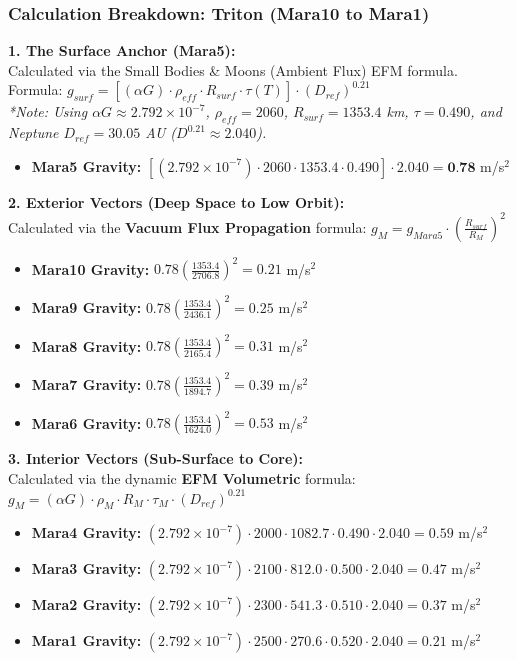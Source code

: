 \documentclass[11pt, a4paper]{article}
\begin{document}
\clearpage
\subsubsection{Calculation Breakdown: Triton (Mara10 to Mara1)}

\noindent \textbf{1. The Surface Anchor (Mara5):} \\
Calculated via the Small Bodies \& Moons (Ambient Flux) EFM formula. \\
Formula: $g_{surf} = \left[ (\alpha G) \cdot \rho_{eff} \cdot R_{surf} \cdot \tau(T) \right] \cdot (D_{ref})^{0.21}$ \\
\textit{*Note: Using $\alpha G \approx 2.792 \times 10^{-7}$, $\rho_{eff} = 2060$, $R_{surf} = 1353.4$ km, $\tau = 0.490$, and Neptune $D_{ref} = 30.05$ AU ($D^{0.21} \approx 2.040$).}
\begin{itemize}
  \item \textbf{Mara5 Gravity:} $\left[ (2.792 \times 10^{-7}) \cdot 2060 \cdot 1353.4 \cdot 0.490 \right] \cdot 2.040 = \textbf{0.78}$ m/s$^2$
\end{itemize}

\vspace{0.5em}
\noindent \textbf{2. Exterior Vectors (Deep Space to Low Orbit):} \\
Calculated via the \textbf{Vacuum Flux Propagation} formula: $g_M = g_{Mara5} \cdot \left( \frac{R_{surf}}{R_M} \right)^2$
\begin{itemize}
  \item \textbf{Mara10 Gravity:} $0.78 \left( \frac{1353.4}{2706.8} \right)^2 = 0.21$ m/s$^2$
  \item \textbf{Mara9 Gravity:} $0.78 \left( \frac{1353.4}{2436.1} \right)^2 = 0.25$ m/s$^2$
  \item \textbf{Mara8 Gravity:} $0.78 \left( \frac{1353.4}{2165.4} \right)^2 = 0.31$ m/s$^2$
  \item \textbf{Mara7 Gravity:} $0.78 \left( \frac{1353.4}{1894.7} \right)^2 = 0.39$ m/s$^2$
  \item \textbf{Mara6 Gravity:} $0.78 \left( \frac{1353.4}{1624.0} \right)^2 = 0.53$ m/s$^2$
\end{itemize}

\vspace{0.5em}
\noindent \textbf{3. Interior Vectors (Sub-Surface to Core):} \\
Calculated via the dynamic \textbf{EFM Volumetric} formula: $g_M = (\alpha G) \cdot \rho_{M} \cdot R_M \cdot \tau_M \cdot (D_{ref})^{0.21}$
\begin{itemize}
  \item \textbf{Mara4 Gravity:} $(2.792 \times 10^{-7}) \cdot 2000 \cdot 1082.7 \cdot 0.490 \cdot 2.040 = 0.59$ m/s$^2$
  \item \textbf{Mara3 Gravity:} $(2.792 \times 10^{-7}) \cdot 2100 \cdot 812.0 \cdot 0.500 \cdot 2.040 = 0.47$ m/s$^2$
  \item \textbf{Mara2 Gravity:} $(2.792 \times 10^{-7}) \cdot 2300 \cdot 541.3 \cdot 0.510 \cdot 2.040 = 0.37$ m/s$^2$
  \item \textbf{Mara1 Gravity:} $(2.792 \times 10^{-7}) \cdot 2500 \cdot 270.6 \cdot 0.520 \cdot 2.040 = 0.21$ m/s$^2$
\end{itemize}
\end{document}
